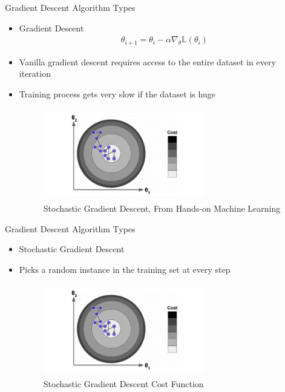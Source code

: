 \begin{frame}{Gradient Descent Algorithm Types}
    \begin{itemize}
        \item Gradient Descent
        \begin{align*}
            \theta_{i+1} = \theta_i - \alpha \nabla_{\theta}\mathbb{L}(\theta_i)
        \end{align*}
        \item Vanilla gradient descent requires access to the entire dataset in every iteration
        \item Training process gets very slow if the dataset is huge
        \begin{figure}
            \centering
            \includegraphics[width=7cm, height=4cm]{Figs/SGD.png}
		    \caption{Stochastic Gradient Descent, From Hands-on Machine Learning}
        \end{figure}
    \end{itemize}
\end{frame}

\begin{frame}{Gradient Descent Algorithm Types}
    \begin{itemize}
        \item Stochastic Gradient Descent
        \item Picks a random instance in the training set at every step
        \begin{figure}
            \includegraphics[width=7cm, height=4cm]{Figs/sgd.png}
		    \caption{Stochastic Gradient Descent Cost Function}
        \end{figure}
    \end{itemize}
\end{frame}